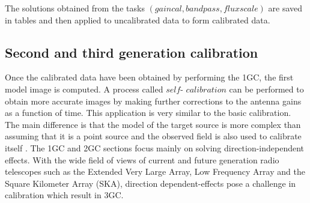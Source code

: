 The solutions obtained from the tasks $(\textit{gaincal}, \textit{bandpass}, \textit{fluxscale})$ are saved in tables and then applied to uncalibrated data 
to form calibrated data.

\subsection{Second and third generation calibration}

Once the calibrated data have been obtained by performing the 1GC, the first model image is computed. A process called $\textit{self- calibration}$ can be performed to obtain more accurate images by making further corrections to the antenna gains as a function of time. This application is very similar to the basic calibration. The main difference is that the model of the target source is more complex than assuming that it is a point source and the observed field is also used to calibrate itself \citep{wieringa1992investigation}. The 1GC and 2GC sections focus mainly on solving direction-independent effects. With the wide field of views of current and future generation radio telescopes such as the Extended Very Large Array, Low Frequency Array and the Square Kilometer Array (SKA), direction dependent-effects pose a challenge in calibration which result in 3GC.
%
%
%


